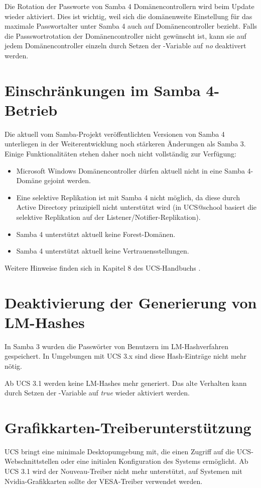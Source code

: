 Die Rotation der Passworte von Samba 4 Domänencontrollern wird beim Update wieder aktiviert.
Dies ist wichtig, weil sich die domänenweite Einstellung für das maximale Passwortalter
unter Samba 4 auch auf Domänencontroller bezieht. Falls die Passswortrotation der
Domänencontroller nicht gewünscht ist, kann sie auf jedem Domänencontroller einzeln
durch Setzen der \ucsUCR{}-Variable  auf \emph{no} deaktivert werden.

\section{Einschränkungen im Samba 4-Betrieb}

Die aktuell vom Samba-Projekt veröffentlichten Versionen von Samba 4
unterliegen in der Weiterentwicklung noch stärkeren Änderungen als Samba
3. Einige Funktionalitäten stehen daher noch nicht vollständig zur Verfügung:

\begin{itemize}
\item Microsoft Windows Domänencontroller dürfen aktuell nicht in eine Samba 4-Domäne
gejoint werden.
\item Eine selektive Replikation ist mit Samba 4 nicht möglich, da diese durch
Active Directory prinzipiell nicht unterstützt wird (in UCS@school
basiert die selektive Replikation auf der Listener/Notifier-Replikation).
\item Samba 4 unterstützt aktuell keine Forest-Domänen. 
\item Samba 4 unterstützt aktuell keine Vertrauensstellungen.
\end{itemize}

Weitere Hinweise finden sich in Kapitel 8 des UCS-Handbuchs \cite{UCS-Handbuch}.

\section{Deaktivierung der Generierung von LM-Hashes}
In Samba 3 wurden die Passwörter von Benutzern im LM-Hashverfahren gespeichert.
In Umgebungen mit UCS 3.x sind diese Hash-Einträge nicht mehr nötig. 

Ab UCS 3.1 werden keine LM-Hashes mehr generiert. Das alte Verhalten kann durch
Setzen der \ucsUCR{}-Variable  auf \emph{true} wieder aktiviert 
werden.

\section{Grafikkarten-Treiberunterstützung}
UCS bringt eine minimale Desktopumgebung mit, die einen Zugriff auf
die UCS-Webschnittstellen oder eine initialen Konfiguration des
Systems ermöglicht. Ab UCS 3.1 wird der Nouveau-Treiber nicht mehr
unterstützt, auf Systemen mit Nvidia-Grafikkarten sollte der
VESA-Treiber verwendet werden.

